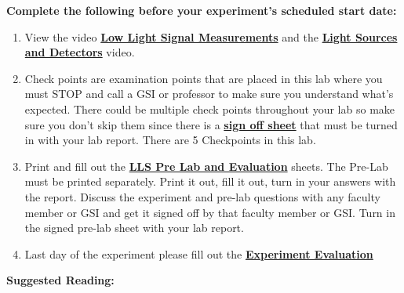 \documentclass{../lab}
\begin{document}
\textbf{Complete the following before your experiment's scheduled start date:}

\begin{enumerate}
    \item View the video \href{http://youtu.be/X4XQ1jcMuoI}{\textbf{Low Light Signal Measurements}} and the \href{http://youtu.be/lQKLakISoBA}{\textbf{Light Sources and Detectors}} video.

    \item Check points are examination points that are placed in this lab where you must STOP and call a GSI or professor to make sure you understand what's expected. There could  be multiple check points throughout your lab so make sure you don't skip them since there is a \href{http://experimentationlab.berkeley.edu/llscheckpoints}{\textbf{sign off sheet}} that must be turned in with your lab report. There are 5 Checkpoints in this lab.

    \item Print and fill out the \href{http://experimentationlab.berkeley.edu/LLSPreLab}{\textbf{LLS Pre Lab and Evaluation}} sheets. The Pre-Lab must be printed separately. Print it out, fill it out, turn in  your answers  with the report. Discuss the experiment and pre-lab questions with any faculty member or GSI and get it signed off by that faculty member or GSI. Turn in the signed pre-lab sheet with your lab report.

    \item Last day of the experiment please fill out the \href{\ExperimentEvaluation}{\textbf{Experiment Evaluation}}

\end{enumerate}

\noindent\textbf{Suggested Reading:}
\end{document}
